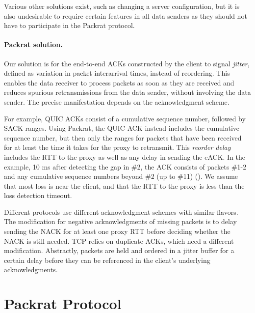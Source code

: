 Various other solutions exist, such as changing a server configuration, but it
is also undesirable to require certain features in all data senders as they
should not have to participate in the Packrat protocol.

\paragraph{Packrat solution.}

Our solution is for the end-to-end ACKs constructed by the client to
signal \textit{jitter}, defined as variation in packet interarrival times,
instead of reordering. This enables the data receiver to process packets as
soon as they are received and reduces spurious retransmissions from the data
sender, without involving the data sender. The precise manifestation depends on
the acknowledgment scheme.

For example, QUIC ACKs consist of a cumulative sequence number, followed by SACK
ranges. Using Packrat, the QUIC ACK instead includes the cumulative sequence
number, but then only the ranges for packets that have been received for at
least the time it takes for the proxy to retransmit. This
\textit{reorder delay} includes the RTT to the proxy
as well as any delay in sending the eACK.
In the example, 10 ms after detecting the gap in \#2, the ACK consists
of packets \#1-2 and any cumulative sequence numbers beyond \#2 (up to \#11)
().
We assume
that most loss is near the client, and that the RTT to the proxy is less than
the loss detection timeout.

Different protocols use different acknowledgment schemes with similar flavors.
The modification for negative acknowledgments of missing packets is to delay
sending the NACK for at least one proxy RTT before deciding whether the NACK is
still needed. TCP relies on duplicate ACKs, which need a different
modification. Abstractly, packets are held and ordered in a jitter buffer for a
certain delay before they can be referenced in the client's underlying
acknowledgments.

\section{Packrat Protocol}

